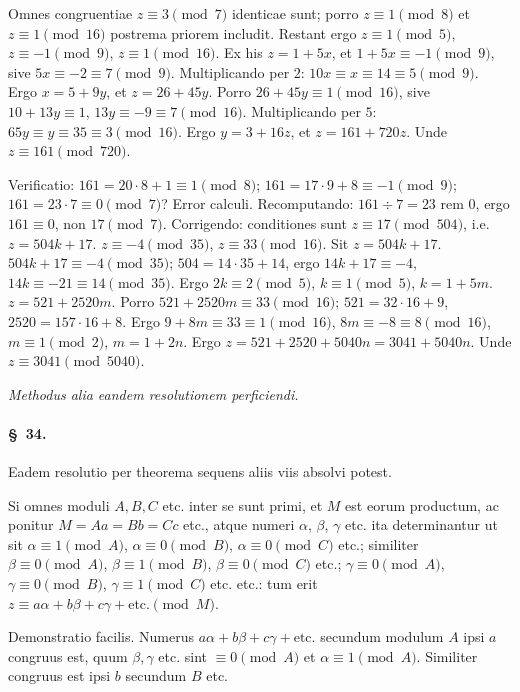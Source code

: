 \documentclass[12pt,a4paper]{article}
\theoremstyle{plain}
\theoremstyle{definition}
\theoremstyle{remark}
\newcommand{\art}[1]{\paragraph{\S\ #1.}}
\begin{document}
Omnes congruentiae $z \equiv 3 \pmod{7}$ identicae sunt; porro $z \equiv 1 \pmod{8}$ et $z \equiv 1 \pmod{16}$ postrema priorem includit. Restant ergo $z \equiv 1 \pmod{5}$, $z \equiv -1 \pmod{9}$, $z \equiv 1 \pmod{16}$. Ex his $z = 1 + 5x$, et $1 + 5x \equiv -1 \pmod{9}$, sive $5x \equiv -2 \equiv 7 \pmod{9}$. Multiplicando per $2$: $10x \equiv x \equiv 14 \equiv 5 \pmod{9}$. Ergo $x = 5 + 9y$, et $z = 26 + 45y$. Porro $26 + 45y \equiv 1 \pmod{16}$, sive $10 + 13y \equiv 1$, $13y \equiv -9 \equiv 7 \pmod{16}$. Multiplicando per $5$: $65y \equiv y \equiv 35 \equiv 3 \pmod{16}$. Ergo $y = 3 + 16z$, et $z = 161 + 720z$. Unde $z \equiv 161 \pmod{720}$.

Verificatio: $161 = 20 \cdot 8 + 1 \equiv 1 \pmod{8}$; $161 = 17 \cdot 9 + 8 \equiv -1 \pmod{9}$; $161 = 23 \cdot 7 \equiv 0 \pmod{7}$? Error calculi. Recomputando: $161 \div 7 = 23$ rem $0$, ergo $161 \equiv 0$, non $17 \pmod{7}$. Corrigendo: conditiones sunt $z \equiv 17 \pmod{504}$, i.e. $z = 504k + 17$. $z \equiv -4 \pmod{35}$, $z \equiv 33 \pmod{16}$. Sit $z = 504k + 17$. $504k + 17 \equiv -4 \pmod{35}$; $504 = 14 \cdot 35 + 14$, ergo $14k + 17 \equiv -4$, $14k \equiv -21 \equiv 14 \pmod{35}$. Ergo $2k \equiv 2 \pmod{5}$, $k \equiv 1 \pmod{5}$, $k = 1 + 5m$. $z = 521 + 2520m$. Porro $521 + 2520m \equiv 33 \pmod{16}$; $521 = 32 \cdot 16 + 9$, $2520 = 157 \cdot 16 + 8$. Ergo $9 + 8m \equiv 33 \equiv 1 \pmod{16}$, $8m \equiv -8 \equiv 8 \pmod{16}$, $m \equiv 1 \pmod{2}$, $m = 1 + 2n$. Ergo $z = 521 + 2520 + 5040n = 3041 + 5040n$. Unde $z \equiv 3041 \pmod{5040}$.

\begin{center}
\textit{Methodus alia eandem resolutionem perficiendi.}
\end{center}

\art{34}
Eadem resolutio per theorema sequens aliis viis absolvi potest.

Si omnes moduli $A, B, C$ etc. inter se sunt primi, et $M$ est eorum productum, ac ponitur $M = Aa = Bb = Cc$ etc., atque numeri $\alpha$, $\beta$, $\gamma$ etc. ita determinantur ut sit $\alpha \equiv 1 \pmod{A}$, $\alpha \equiv 0 \pmod{B}$, $\alpha \equiv 0 \pmod{C}$ etc.; similiter $\beta \equiv 0 \pmod{A}$, $\beta \equiv 1 \pmod{B}$, $\beta \equiv 0 \pmod{C}$ etc.; $\gamma \equiv 0 \pmod{A}$, $\gamma \equiv 0 \pmod{B}$, $\gamma \equiv 1 \pmod{C}$ etc. etc.: tum erit $z \equiv a\alpha + b\beta + c\gamma + \text{etc.} \pmod{M}$.

Demonstratio facilis. Numerus $a\alpha + b\beta + c\gamma + \text{etc.}$ secundum modulum $A$ ipsi $a$ congruus est, quum $\beta, \gamma$ etc. sint $\equiv 0 \pmod{A}$ et $\alpha \equiv 1 \pmod{A}$. Similiter congruus est ipsi $b$ secundum $B$ etc.
\end{document}
